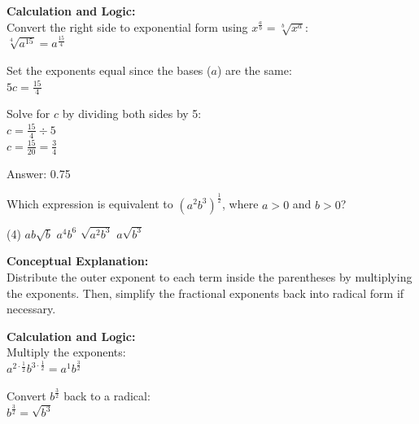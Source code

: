 \documentclass[11pt,paper=a4,answers]{exam}
\begin{document}
\begin{questions}
\begin{solution}
\vspace{20pt}

\textbf{Calculation and Logic:} \\
Convert the right side to exponential form using $x^{\frac{a}{b}} = \sqrt[b]{x^a}$: \\
$\sqrt[4]{a^{15}} = a^{\frac{15}{4}}$

\vspace{10pt}

Set the exponents equal since the bases ($a$) are the same: \\
$5c = \frac{15}{4}$

\vspace{10pt}

Solve for $c$ by dividing both sides by 5: \\
$c = \frac{15}{4} \div 5$ \\
$c = \frac{15}{20} = \frac{3}{4}$

\vspace{25pt}

Answer: \colorbox{yellow!100}{0.75}
\end{solution}

\vspace{40pt}

\question
Which expression is equivalent to $(a^2b^3)^{\frac{1}{2}}$, where $a > 0$ and $b > 0$?
\begin{tasks}(4)
    \task $ab\sqrt{b}$
    \task $a^4b^6$
    \task $\sqrt{a^2b^3}$
    \task $a\sqrt{b^3}$
\end{tasks}

\begin{solution}
\textbf{Conceptual Explanation:} \\
Distribute the outer exponent to each term inside the parentheses by multiplying the exponents. Then, simplify the fractional exponents back into radical form if necessary.

\vspace{20pt}

\textbf{Calculation and Logic:} \\
Multiply the exponents: \\
$a^{2 \cdot \frac{1}{2}} b^{3 \cdot \frac{1}{2}} = a^1 b^{\frac{3}{2}}$

\vspace{10pt}

Convert $b^{\frac{3}{2}}$ back to a radical: \\
$b^{\frac{3}{2}} = \sqrt{b^3}$


\end{solution}
\end{questions}
\end{document}
